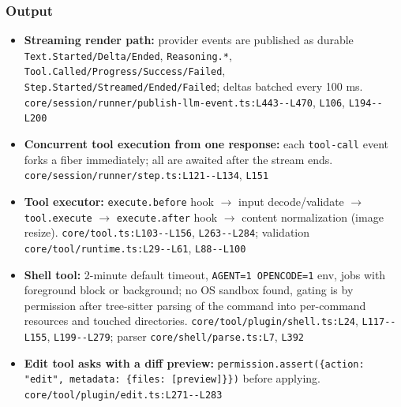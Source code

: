 \subsubsection*{Output}
\begin{itemize}
\item \textbf{Streaming render path:} provider events are published as durable \texttt{Text.\allowbreak{}Started/\allowbreak{}Delta/\allowbreak{}Ended}, \texttt{Reasoning.\allowbreak{}*}, \texttt{Tool.\allowbreak{}Called/\allowbreak{}Progress/\allowbreak{}Success/\allowbreak{}Failed}, \texttt{Step.\allowbreak{}Started/\allowbreak{}Streamed/\allowbreak{}Ended/\allowbreak{}Failed}; deltas batched every 100 ms. \texttt{core/\allowbreak{}session/\allowbreak{}runner/\allowbreak{}publish-\allowbreak{}llm-\allowbreak{}event.\allowbreak{}ts:\allowbreak{}L443-\allowbreak{}-\allowbreak{}L470}, \texttt{L106}, \texttt{L194-\allowbreak{}-\allowbreak{}L200}
\item \textbf{Concurrent tool execution from one response:} each \texttt{tool-\allowbreak{}call} event forks a fiber immediately; all are awaited after the stream ends. \texttt{core/\allowbreak{}session/\allowbreak{}runner/\allowbreak{}step.\allowbreak{}ts:\allowbreak{}L121-\allowbreak{}-\allowbreak{}L134}, \texttt{L151}
\item \textbf{Tool executor:} \texttt{execute.\allowbreak{}before} hook $\rightarrow$ input decode/validate $\rightarrow$ \texttt{tool.\allowbreak{}execute} $\rightarrow$ \texttt{execute.\allowbreak{}after} hook $\rightarrow$ content normalization (image resize). \texttt{core/\allowbreak{}tool.\allowbreak{}ts:\allowbreak{}L103-\allowbreak{}-\allowbreak{}L156}, \texttt{L263-\allowbreak{}-\allowbreak{}L284}; validation \texttt{core/\allowbreak{}tool/\allowbreak{}runtime.\allowbreak{}ts:\allowbreak{}L29-\allowbreak{}-\allowbreak{}L61}, \texttt{L88-\allowbreak{}-\allowbreak{}L100}
\item \textbf{Shell tool:} 2-minute default timeout, \texttt{AGENT=1 OPENCODE=1} env, jobs with foreground block or background; no OS sandbox found, gating is by permission after tree-sitter parsing of the command into per-command resources and touched directories. \texttt{core/\allowbreak{}tool/\allowbreak{}plugin/\allowbreak{}shell.\allowbreak{}ts:\allowbreak{}L24}, \texttt{L117-\allowbreak{}-\allowbreak{}L155}, \texttt{L199-\allowbreak{}-\allowbreak{}L279}; parser \texttt{core/\allowbreak{}shell/\allowbreak{}parse.\allowbreak{}ts:\allowbreak{}L7}, \texttt{L392}
\item \textbf{Edit tool asks with a diff preview:} \texttt{permission.\allowbreak{}assert(\allowbreak{}\{action:\allowbreak{} "edit", metadata:\allowbreak{} \{files:\allowbreak{} [preview]\}\})} before applying. \texttt{core/\allowbreak{}tool/\allowbreak{}plugin/\allowbreak{}edit.\allowbreak{}ts:\allowbreak{}L271-\allowbreak{}-\allowbreak{}L283}

\end{itemize}
